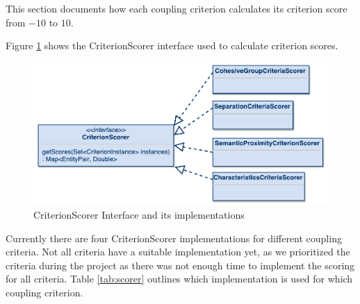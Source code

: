 This section documents how each coupling criterion calculates its criterion score from $-10$ to $10$. 

Figure \ref{fig:scorer} shows the CriterionScorer interface used to calculate criterion scores. 

\begin{figure}[H]
	\begin{center}
		\includegraphics[scale=0.7]{diagrams/scorer.pdf}
		\caption{CriterionScorer Interface and its implementations}
		\label{fig:scorer}
	\end{center}
\end{figure}

Currently there are four CriterionScorer implementations for different coupling criteria. Not all criteria have a suitable implementation yet, as we prioritized the criteria during the project as there was not enough time to implement the scoring for all criteria. Table \ref{tab:scorer} outlines which implementation is used for which coupling criterion.

